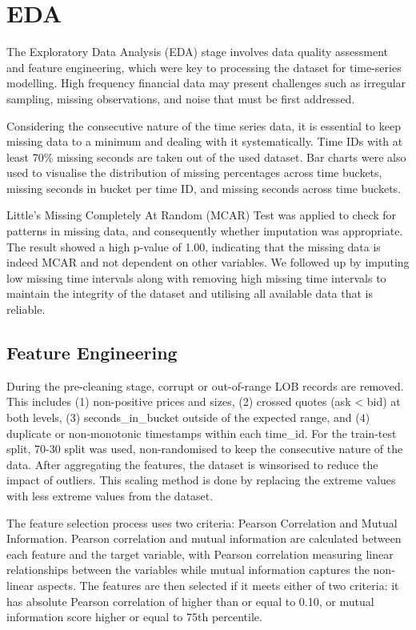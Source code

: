\documentclass[
  letterpaper,
  DIV=11,
  numbers=noendperiod]{scrartcl}
\begin{document}
\section{EDA}\label{eda}

The Exploratory Data Analysis (EDA) stage involves data quality
assessment and feature engineering, which were key to processing the
dataset for time-series modelling. High frequency financial data may
present challenges such as irregular sampling, missing observations, and
noise that must be first addressed.

Considering the consecutive nature of the time series data, it is
essential to keep missing data to a minimum and dealing with it
systematically. Time IDs with at least 70\% missing seconds are taken
out of the used dataset. Bar charts were also used to visualise the
distribution of missing percentages across time buckets, missing seconds
in bucket per time ID, and missing seconds across time buckets.

Little's Missing Completely At Random (MCAR) Test was applied to check
for patterns in missing data, and consequently whether imputation was
appropriate. The result showed a high p-value of 1.00, indicating that
the missing data is indeed MCAR and not dependent on other variables. We
followed up by imputing low missing time intervals along with removing
high missing time intervals to maintain the integrity of the dataset and
utilising all available data that is reliable.

\subsection{Feature Engineering}\label{feature-engineering}

During the pre-cleaning stage, corrupt or out-of-range LOB records are
removed. This includes (1) non-positive prices and sizes, (2) crossed
quotes (ask \textless{} bid) at both levels, (3) seconds\_in\_bucket
outside of the expected range, and (4) duplicate or non-monotonic
timestamps within each time\_id. For the train-test split, 70-30 split
was used, non-randomised to keep the consecutive nature of the data.
After aggregating the features, the dataset is winsorised to reduce the
impact of outliers. This scaling method is done by replacing the extreme
values with less extreme values from the dataset.

The feature selection process uses two criteria: Pearson Correlation and
Mutual Information. Pearson correlation and mutual information are
calculated between each feature and the target variable, with Pearson
correlation measuring linear relationships between the variables while
mutual information captures the non-linear aspects. The features are
then selected if it meets either of two criteria: it has absolute
Pearson correlation of higher than or equal to 0.10, or mutual
information score higher or equal to 75th percentile.
\end{document}
